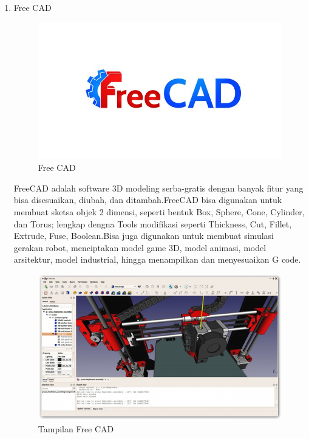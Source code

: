 \begin{enumerate}
\item Free CAD
\begin{figure}[H]
\centering
\includegraphics[width=1\textwidth]{figures/cad2.jpg}
\caption{Free CAD}
\label{print}
\end{figure}
\par FreeCAD adalah software 3D modeling serba-gratis dengan banyak fitur yang bisa disesuaikan, diubah, dan ditambah.FreeCAD bisa digunakan untuk membuat sketsa objek 2 dimensi, seperti bentuk Box, Sphere, Cone, Cylinder, dan Torus; lengkap dengna Tools modifikasi seperti Thickness, Cut, Fillet, Extrude, Fuse, Boolean.Bisa juga digunakan untuk membuat simulasi gerakan robot, menciptakan model game 3D, model animasi, model arsitektur, model industrial, hingga menampilkan dan menyesuaikan G code.

\begin{figure}[H]
\centering
\includegraphics[width=1\textwidth]{figures/cad1.jpg}
\caption{Tampilan Free CAD}
\label{print}
\end{figure}


\end{enumerate}
